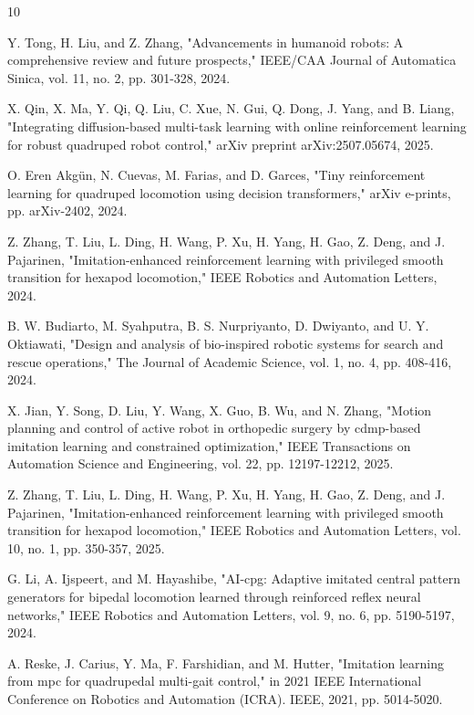 \documentclass[letterpaper, 10pt, conference]{IEEEtran}
\begin{document}
\begin{thebibliography}{10}

 Y. Tong, H. Liu, and Z. Zhang, "Advancements in humanoid robots: A comprehensive review and future prospects," IEEE/CAA Journal of Automatica Sinica, vol. 11, no. 2, pp. 301-328, 2024.

 X. Qin, X. Ma, Y. Qi, Q. Liu, C. Xue, N. Gui, Q. Dong, J. Yang, and B. Liang, "Integrating diffusion-based multi-task learning with online reinforcement learning for robust quadruped robot control," arXiv preprint arXiv:2507.05674, 2025.

 O. Eren Akgün, N. Cuevas, M. Farias, and D. Garces, "Tiny reinforcement learning for quadruped locomotion using decision transformers," arXiv e-prints, pp. arXiv-2402, 2024.

 Z. Zhang, T. Liu, L. Ding, H. Wang, P. Xu, H. Yang, H. Gao, Z. Deng, and J. Pajarinen, "Imitation-enhanced reinforcement learning with privileged smooth transition for hexapod locomotion," IEEE Robotics and Automation Letters, 2024.

 B. W. Budiarto, M. Syahputra, B. S. Nurpriyanto, D. Dwiyanto, and U. Y. Oktiawati, "Design and analysis of bio-inspired robotic systems for search and rescue operations," The Journal of Academic Science, vol. 1, no. 4, pp. 408-416, 2024.

 X. Jian, Y. Song, D. Liu, Y. Wang, X. Guo, B. Wu, and N. Zhang, "Motion planning and control of active robot in orthopedic surgery by cdmp-based imitation learning and constrained optimization," IEEE Transactions on Automation Science and Engineering, vol. 22, pp. 12197-12212, 2025.

 Z. Zhang, T. Liu, L. Ding, H. Wang, P. Xu, H. Yang, H. Gao, Z. Deng, and J. Pajarinen, "Imitation-enhanced reinforcement learning with privileged smooth transition for hexapod locomotion," IEEE Robotics and Automation Letters, vol. 10, no. 1, pp. 350-357, 2025.

 G. Li, A. Ijspeert, and M. Hayashibe, "AI-cpg: Adaptive imitated central pattern generators for bipedal locomotion learned through reinforced reflex neural networks," IEEE Robotics and Automation Letters, vol. 9, no. 6, pp. 5190-5197, 2024.

 A. Reske, J. Carius, Y. Ma, F. Farshidian, and M. Hutter, "Imitation learning from mpc for quadrupedal multi-gait control," in 2021 IEEE International Conference on Robotics and Automation (ICRA). IEEE, 2021, pp. 5014-5020.


\end{thebibliography}
\end{document}
